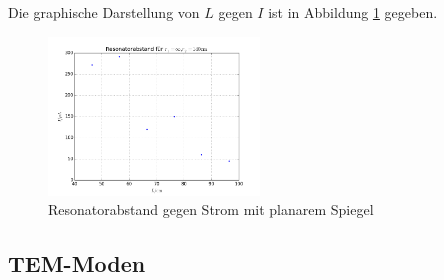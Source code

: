 \noindent Die graphische Darstellung von \(L\) gegen \(I\) ist in Abbildung \ref{fig:stabil2} gegeben.

\begin{figure}
	\centering
		\includegraphics[width=0.5\textwidth]{stabil2.png}
	\caption{Resonatorabstand gegen Strom mit planarem Spiegel}
	\label{fig:stabil2}
\end{figure}

\subsection{TEM-Moden}

